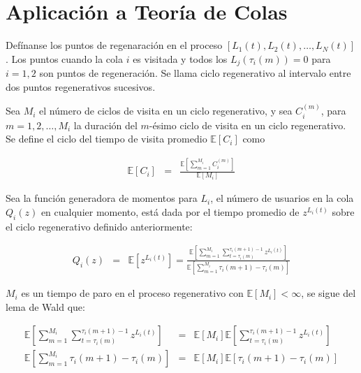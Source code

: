 \documentclass{article}
\newcommand{\esp}{\mathbb{E}}
\begin{document}
\section{Aplicaci\'on a Teor\'ia de Colas}



Def\'inanse los puntos de regenaraci\'on  en el proceso $\left[L_{1}\left(t\right),L_{2}\left(t\right),\ldots,L_{N}\left(t\right)\right]$. Los puntos cuando la cola $i$ es visitada y todos los $L_{j}\left(\tau_{i}\left(m\right)\right)=0$ para $i=1,2$  son puntos de regeneraci\'on. Se llama ciclo regenerativo al intervalo entre dos puntos regenerativos sucesivos.

Sea $M_{i}$  el n\'umero de ciclos de visita en un ciclo regenerativo, y sea $C_{i}^{(m)}$, para $m=1,2,\ldots,M_{i}$ la duraci\'on del $m$-\'esimo ciclo de visita en un ciclo regenerativo. Se define el ciclo del tiempo de visita promedio $\esp\left[C_{i}\right]$ como

\begin{eqnarray*}
\esp\left[C_{i}\right]&=&\frac{\esp\left[\sum_{m=1}^{M_{i}}C_{i}^{(m)}\right]}{\esp\left[M_{i}\right]}
\end{eqnarray*}




Sea la funci\'on generadora de momentos para $L_{i}$, el n\'umero de usuarios en la cola $Q_{i}\left(z\right)$ en cualquier momento, est\'a dada por el tiempo promedio de $z^{L_{i}\left(t\right)}$ sobre el ciclo regenerativo definido anteriormente:

\begin{eqnarray*}
Q_{i}\left(z\right)&=&\esp\left[z^{L_{i}\left(t\right)}\right]=\frac{\esp\left[\sum_{m=1}^{M_{i}}\sum_{t=\tau_{i}\left(m\right)}^{\tau_{i}\left(m+1\right)-1}z^{L_{i}\left(t\right)}\right]}{\esp\left[\sum_{m=1}^{M_{i}}\tau_{i}\left(m+1\right)-\tau_{i}\left(m\right)\right]}
\end{eqnarray*}

$M_{i}$ es un tiempo de paro en el proceso regenerativo con $\esp\left[M_{i}\right]<\infty$, se sigue del lema de Wald que:


\begin{eqnarray*}
\esp\left[\sum_{m=1}^{M_{i}}\sum_{t=\tau_{i}\left(m\right)}^{\tau_{i}\left(m+1\right)-1}z^{L_{i}\left(t\right)}\right]&=&\esp\left[M_{i}\right]\esp\left[\sum_{t=\tau_{i}\left(m\right)}^{\tau_{i}\left(m+1\right)-1}z^{L_{i}\left(t\right)}\right]\\
\esp\left[\sum_{m=1}^{M_{i}}\tau_{i}\left(m+1\right)-\tau_{i}\left(m\right)\right]&=&\esp\left[M_{i}\right]\esp\left[\tau_{i}\left(m+1\right)-\tau_{i}\left(m\right)\right]
\end{eqnarray*}
\end{document}
